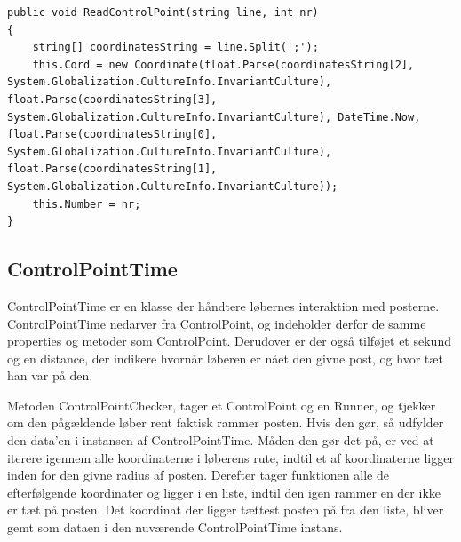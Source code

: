 \begin{lstlisting}
public void ReadControlPoint(string line, int nr)
{
    string[] coordinatesString = line.Split(';');
    this.Cord = new Coordinate(float.Parse(coordinatesString[2], System.Globalization.CultureInfo.InvariantCulture), float.Parse(coordinatesString[3], System.Globalization.CultureInfo.InvariantCulture), DateTime.Now, float.Parse(coordinatesString[0], System.Globalization.CultureInfo.InvariantCulture), float.Parse(coordinatesString[1], System.Globalization.CultureInfo.InvariantCulture));
    this.Number = nr;
}
\end{lstlisting}

\subsection{ControlPointTime}
ControlPointTime er en klasse der håndtere løbernes interaktion med posterne. ControlPointTime nedarver fra ControlPoint, og indeholder derfor de samme properties og metoder som ControlPoint. Derudover er der også tilføjet et sekund og en distance, der indikere hvornår løberen er nået den givne post, og hvor tæt han var på den. 

Metoden ControlPointChecker, tager et ControlPoint og en Runner, og tjekker om den pågældende løber rent faktisk rammer posten. Hvis den gør, så udfylder den data’en i instansen af ControlPointTime. 
Måden den gør det på, er ved at iterere igennem alle koordinaterne i løberens rute, indtil et af koordinaterne ligger inden for den givne radius af posten. Derefter tager funktionen alle de efterfølgende koordinater og ligger i en liste, indtil den igen rammer en der ikke er tæt på posten. 
Det koordinat der ligger tættest posten på fra den liste, bliver gemt som dataen i den nuværende ControlPointTime instans. 


